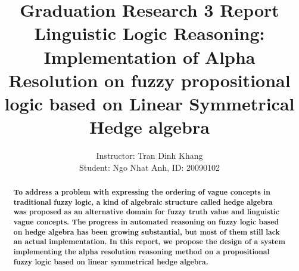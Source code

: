 \documentclass[12pt,fleqn,a4paper]{report}
\date{}
\begin{document}
\title{{\huge Graduation Research 3 Report}\\
Linguistic Logic Reasoning:\\
Implementation of Alpha Resolution on fuzzy propositional logic based on Linear Symmetrical Hedge algebra\\
}
\author{Instructor: Tran Dinh Khang\\Student: Ngo Nhat Anh, ID: 20090102}
\maketitle

%
%
\begin{abstract}
{\bfseries To address a problem with expressing the ordering
	of vague concepts in traditional fuzzy logic, a kind
	of algebraic structure called hedge algebra was
	proposed as an alternative domain for fuzzy truth
	value and linguistic vague concepts. The progress in
	automated reasoning on fuzzy logic based on hedge
	algebra has been growing substantial, but most of
	them still lack an actual implementation. In this
	report, we propose the design of a system implementing 
	the alpha resolution reasoning method
	on a propositional fuzzy logic based on linear
	symmetrical hedge algebra.
}
\end{abstract}
\tableofcontents



\end{document}
